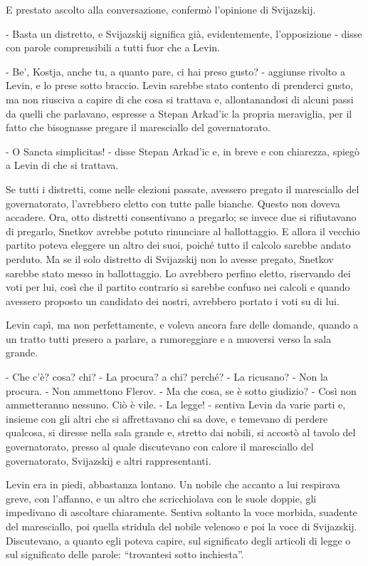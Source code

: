 E prestato ascolto alla conversazione, confermò l'opinione di Svijazskij. 

- Basta un distretto, e Svijazskij significa già, evidentemente, l'opposizione - disse con parole comprensibili a tutti fuor che a Levin. 

- Be', Kostja, anche tu, a quanto pare, ci hai preso gusto? - aggiunse rivolto a Levin, e lo prese sotto braccio. Levin sarebbe stato contento di prenderci gusto, ma non riusciva a capire di che cosa si trattava e, allontanandosi di alcuni passi da quelli che parlavano, espresse a Stepan Arkad'ic la propria meraviglia, per il fatto che bisognasse pregare il maresciallo del governatorato. 

- O Sancta simplicitas! - disse Stepan Arkad'ic e, in breve e con chiarezza, spiegò a Levin di che si trattava. 

Se tutti i distretti, come nelle elezioni passate, avessero pregato il maresciallo del governatorato, l'avrebbero eletto con tutte palle bianche. Questo non doveva accadere. Ora, otto distretti consentivano a pregarlo; se invece due si rifiutavano di pregarlo, Snetkov avrebbe potuto rinunciare al ballottaggio. E allora il vecchio partito poteva eleggere un altro dei suoi, poiché tutto il calcolo sarebbe andato perduto. Ma se il solo distretto di Svijazskij non lo avesse pregato, Snetkov sarebbe stato messo in ballottaggio. Lo avrebbero perfino eletto, riservando dei voti per lui, così che il partito contrario si sarebbe confuso nei calcoli e quando avessero proposto un candidato dei nostri, avrebbero portato i voti su di lui. 

Levin capì, ma non perfettamente, e voleva ancora fare delle domande, quando a un tratto tutti presero a parlare, a rumoreggiare e a muoversi verso la sala grande. 

- Che c'è? cosa? chi? - La procura? a chi? perché? - La ricusano? - Non la procura. - Non ammettono Flerov. - Ma che cosa, se è sotto giudizio? - Così non ammetteranno nessuno. Ciò è vile. - La legge! - sentiva Levin da varie parti e, insieme con gli altri che si affrettavano chi sa dove, e temevano di perdere qualcosa, si diresse nella sala grande e, stretto dai nobili, si accostò al tavolo del governatorato, presso al quale discutevano con calore il maresciallo del governatorato, Svijazskij e altri rappresentanti. 

\label{xxviii-4} 

Levin era in piedi, abbastanza lontano. Un nobile che accanto a lui respirava greve, con l'affanno, e un altro che scricchiolava con le suole doppie, gli impedivano di ascoltare chiaramente. Sentiva soltanto la voce morbida, suadente del maresciallo, poi quella stridula del nobile velenoso e poi la voce di Svijazskij. Discutevano, a quanto egli poteva capire, sul significato degli articoli di legge o sul significato delle parole: ``trovantesi sotto inchiesta''. 

